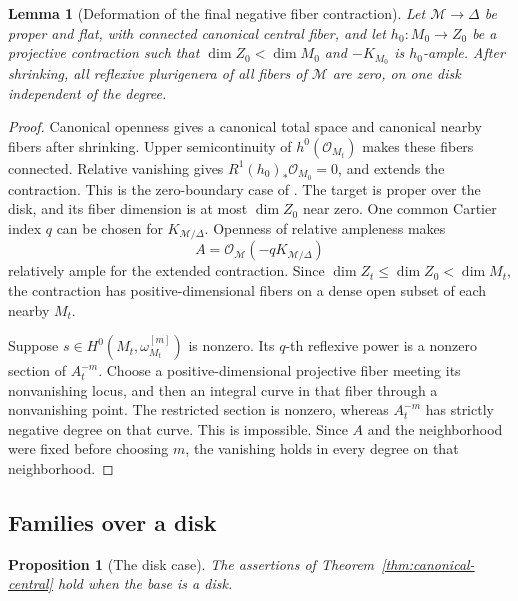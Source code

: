 \documentclass[11pt,a4paper]{article}
\numberwithin{equation}{section}
\newtheorem{proposition}[theorem]{Proposition}
\newtheorem{lemma}[theorem]{Lemma}
\theoremstyle{definition}
\theoremstyle{remark}
\newcommand{\OO}{\mathcal O}\newcommand{\cX}{\mathcal X}
\begin{document}
\begin{lemma}[Deformation of the final negative fiber contraction]
\label{lem:deform-mori}
Let $\mathcal M\to\Delta$ be proper and flat, with connected canonical
central fiber, and let $h_0:M_0\to Z_0$ be a projective contraction
such that $\dim Z_0<\dim M_0$ and $-K_{M_0}$ is $h_0$-ample.
After shrinking, all reflexive plurigenera of all fibers of
$\mathcal M$ are zero, on one disk independent of the degree.
\end{lemma}

\begin{proof}
Canonical openness gives a canonical total space and canonical
nearby fibers after shrinking. Upper semicontinuity of
$h^0(\OO_{M_t})$ makes these fibers connected.
Relative vanishing \cite[Theorem~5.2]{Fujino2022} gives
$R^1(h_0)_*\OO_{M_0}=0$, and
\cite[Proposition~11.4]{KM1992} extends the contraction.
This is the zero-boundary case of
\cite[Proposition~4.9]{HLR2026}. The target is proper over the disk,
and its fiber dimension is at most $\dim Z_0$ near zero.
One common Cartier index $q$ can be chosen for
$K_{\mathcal M/\Delta}$. Openness of relative ampleness makes
\[
 A=\OO_{\mathcal M}(-qK_{\mathcal M/\Delta})
\]
relatively ample for the extended contraction. Since
$\dim Z_t\le\dim Z_0<\dim M_t$, the contraction has
positive-dimensional fibers on a dense open subset of each nearby
$M_t$.

Suppose $s\in H^0(M_t,\omega_{M_t}^{[m]})$ is nonzero. Its
$q$-th reflexive power is a nonzero section of $A_t^{-m}$.
Choose a positive-dimensional projective fiber meeting its
nonvanishing locus, and then an integral curve in that fiber
through a nonvanishing point. The restricted section is nonzero,
whereas $A_t^{-m}$ has strictly negative degree on that curve.
This is impossible. Since $A$ and the neighborhood were fixed before choosing $m$,
the vanishing holds in every degree on that neighborhood.
\end{proof}

\subsection{Families over a disk}

\begin{proposition}[The disk case]\label{prop:canonical-disk}
The assertions of Theorem~\ref{thm:canonical-central} hold when
the base is a disk.
\end{proposition}
\end{document}
